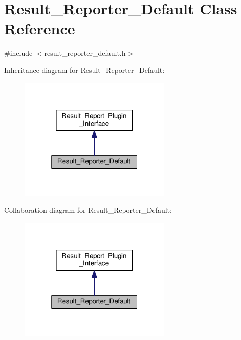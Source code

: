 \hypertarget{classResult__Reporter__Default}{}\section{Result\+\_\+\+Reporter\+\_\+\+Default Class Reference}
\label{classResult__Reporter__Default}


{\ttfamily \#include $<$result\+\_\+reporter\+\_\+default.\+h$>$}



Inheritance diagram for Result\+\_\+\+Reporter\+\_\+\+Default\+:\nopagebreak
\begin{figure}[H]
\begin{center}
\leavevmode
\includegraphics[width=205pt]{classResult__Reporter__Default__inherit__graph}
\end{center}
\end{figure}


Collaboration diagram for Result\+\_\+\+Reporter\+\_\+\+Default\+:\nopagebreak
\begin{figure}[H]
\begin{center}
\leavevmode
\includegraphics[width=205pt]{classResult__Reporter__Default__coll__graph}
\end{center}
\end{figure}
